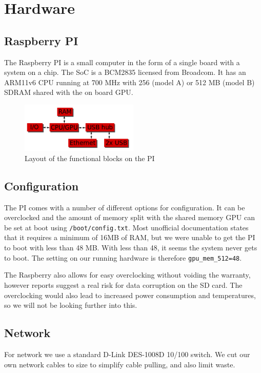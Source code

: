 \clearpage
\section{Hardware}

\subsection{Raspberry PI}
The Raspberry PI is a small computer in the form of a single board with a system on a chip. The SoC is a BCM2835 licensed from Broadcom. It has an ARM11v6 CPU running at 700 MHz with 256 (model A) or 512 MB (model B) SDRAM shared with the on board GPU.
\begin{figure}[h]
    \includegraphics[width=0.5\textwidth]{hardware/raspberrypi_block_function}
    \caption{Layout of the functional blocks on the PI}
    \label{fig:pi_blockdiagram}
\end{figure}

\subsection{Configuration}
The PI comes with a number of different options for configuration. It can be overclocked and the amount of memory split with the shared memory GPU can be set at boot using {\tt /boot/config.txt}.
Most unofficial documentation states that it requires a minimum of 16MB of RAM, but we were unable to get the PI to boot with less than 48 MB. With less than 48, it seems the system never gets to boot.
The setting on our running hardware is therefore {\tt gpu\_mem\_512=48}.

The Raspberry also allows for easy overclocking without voiding the warranty, however reports suggest a real risk for data corruption on the SD card.
The overclocking would also lead to increased power consumption and temperatures, so we will not be looking further into this.

\subsection{Network}
For network we use a standard D-Link DES-1008D 10/100 switch. We cut our own network cables to size to simplify cable pulling, and also limit waste.

